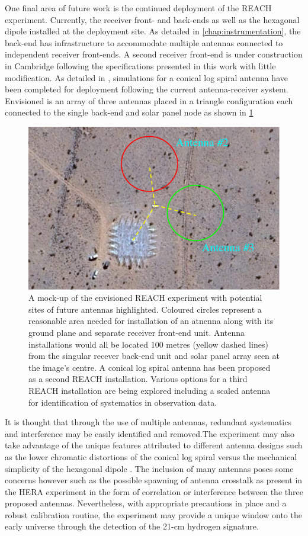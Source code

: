 One final area of future work is the continued deployment of the REACH experiment. Currently, the receiver front- and back-ends as well as the hexagonal dipole installed at the deployment site. As detailed in \cref{chap:instrumentation}, the back-end has infrastructure to accommodate multiple antennas connected to independent receiver front-ends. A second receiver front-end is under construction in Cambridge following the specifications presented in this work with little modification. As detailed in \citet{reach}, simulations for a conical log spiral antenna have been completed for deployment following the current antenna-receiver system. Envisioned is an array of three antennas placed in a triangle configuration each connected to the single back-end and solar panel node as shown in \cref{fig:reach_prime}
\begin{figure}
    \centering
    \includegraphics[width=.7\textwidth]{reach_prime}
    \caption{A mock-up of the envisioned REACH experiment with potential sites of future antennas highlighted. Coloured circles represent a reasonable area needed for installation of an atnenna along with its ground plane and separate receiver front-end unit. Antenna installations would all be located 100 metres (yellow dashed lines) from the singular recever back-end unit and solar panel array seen at the image's centre. A conical log spiral antenna has been proposed as a second REACH installation. Various options for a third REACH installation are being explored including a scaled antenna for identification of systematics in observation data.}
    \label{fig:reach_prime}
\end{figure}
It is thought that through the use of multiple antennas, redundant systematics and interference may be easily identified and removed.The experiment may also take advantage of the unique features attributed to different antenna designs such as the lower chromatic distortions of the conical log spiral versus the mechanical simplicity of the hexagonal dipole \citep{dom_antenna,john_antenna,reach}. The inclusion of many antennas poses some concerns however such as the possible spawning of antenna crosstalk as present in the HERA experiment \citep{hera_crosstalk} in the form of correlation or interference between the three proposed antennas. Nevertheless, with appropriate precautions in place and a robust calibration routine, the experiment may provide a unique window onto the early universe through the detection of the 21-cm hydrogen signature.


